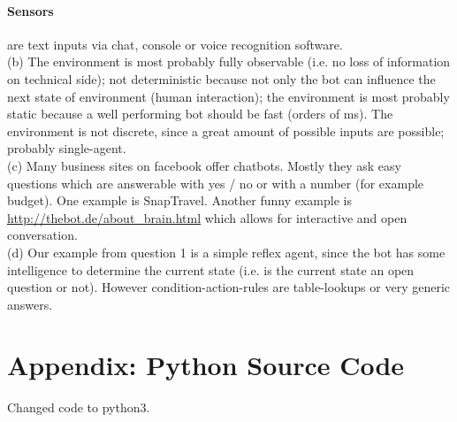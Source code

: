 \documentclass[11pt,a4paper,twoside]{article}
\begin{document}
\paragraph{Sensors} are text inputs via chat, console or voice recognition software.\vspace{20pt} \\
(b) The environment is most probably fully observable (i.e. no loss of information on technical side); not deterministic because not only the bot can influence the next state of environment (human interaction); the environment is most probably static because a well performing bot should be fast (orders of ms).
The environment is not discrete, since a great amount of possible inputs are possible; probably single-agent.\\
(c) Many business sites on facebook offer chatbots. Mostly they ask easy questions which are answerable with yes / no or with a number (for example budget).
One example is SnapTravel.
Another funny example is \url{http://thebot.de/about_brain.html} which allows for interactive and open conversation.\\
(d) Our example from question 1 is a simple reflex agent, since the bot has some intelligence to determine the current state (i.e. is the current state an open question or not).
However condition-action-rules are table-lookups or very generic answers.



\newpage
\section{Appendix: Python Source Code}
Changed code to python3.

\end{document}
